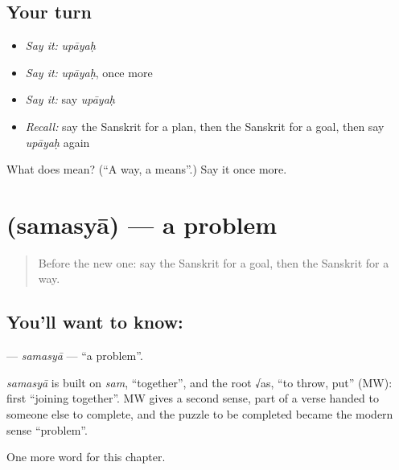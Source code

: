 \subsection*{Your turn}
\begin{itemize}
\raggedright
  \item \emph{Say it:} \emph{upāyaḥ}
  \item \emph{Say it:} \emph{upāyaḥ}, once more
  \item \emph{Say it:} say \emph{upāyaḥ}
  \item \emph{Recall:} say the Sanskrit for a plan, then the Sanskrit for a goal, then say \emph{upāyaḥ} again
\end{itemize}

\begin{tcolorbox}[breakable,colback=teal!4,colframe=teal!35!black,title={Before you move on}]
What does  mean? (\textquotedblleft{}A way, a means\textquotedblright{}.) Say it once more.
\end{tcolorbox}
\section[\texorpdfstring{\sk{समस्या} (samasyā)}{समस्या (samasyā)}]{ (samasyā) — a problem}

\label{lesson:SA-C201-samasya}



\begin{quote}
Before the new one: say the Sanskrit for a goal, then the Sanskrit for a way.
\end{quote}

\subsection*{You'll want to know: }
\textbf{} — \emph{samasyā} — \textquotedblleft{}a problem\textquotedblright{}.

\begin{cousinweb}
\emph{samasyā} is built on \emph{sam}, \textquotedblleft{}together\textquotedblright{}, and the root √as, \textquotedblleft{}to throw, put\textquotedblright{} (MW): first \textquotedblleft{}joining together\textquotedblright{}. MW gives a second sense, part of a verse handed to someone else to complete, and the puzzle to be completed became the modern sense \textquotedblleft{}problem\textquotedblright{}.
\end{cousinweb}

\begin{grammarlens}[title={What you've built}]
One more word for this chapter.
\end{grammarlens}

